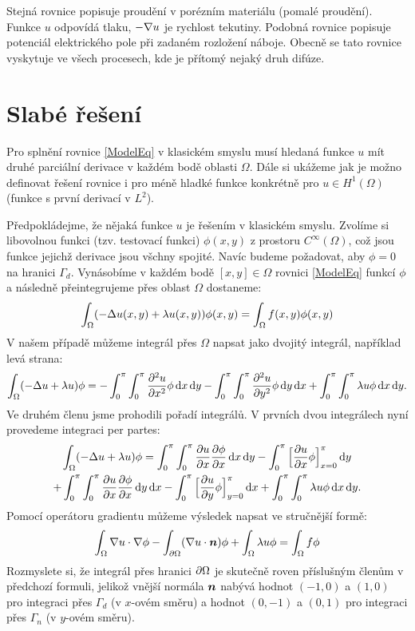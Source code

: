 Stejná rovnice popisuje proudění v porézním materiálu (pomalé proudění). Funkce $u$ odpovídá tlaku, $-\nabla u$ je rychlost tekutiny. Podobná rovnice popisuje potenciál elektrického pole při zadaném rozložení náboje.
Obecně se tato rovnice vyskytuje ve všech procesech, kde je přítomý nejaký druh difúze.


\section{Slabé řešení}
Pro splnění rovnice \eqref{ModelEq} v klasickém smyslu musí hledaná funkce $u$ mít druhé parciální derivace v každém bodě oblasti $\Omega$. Dále si ukážeme jak je možno definovat 
řešení rovnice i pro méně hladké funkce konkrétně pro $u\in H^1(\Omega)$ (funkce s první derivací v $L^2$). 

Předpokládejme, že nějaká funkce $u$ je řešením v klasickém smyslu. 
Zvolíme si libovolnou funkci (tzv. testovací funkci) $\phi(x,y)$ z prostoru $C^{\infty}(\Omega)$, což jsou funkce jejichž derivace jsou všchny spojité.
Navíc budeme požadovat, aby $\phi = 0$ na hranici $\Gamma_d$. Vynásobíme v každém bodě $[x,y]\in \Omega$ rovnici \eqref{ModelEq} funkcí $\phi$ a následně přeintegrujeme přes oblast $\Omega$
dostaneme:
\[
  \int_\Omega (-\Delta u(x,y) + \lambda u(x,y)) \phi(x,y) = \int_\Omega f(x,y)\phi(x,y)
\]
V našem případě můžeme integrál přes $\Omega$ napsat jako dvojitý integrál, například levá strana:
\[
  \int_\Omega (-\Delta u + \lambda u) \phi =
  - \int_0^\pi \int_0^\pi \frac{\partial^2 u}{\partial x^2} \phi \,{\rm d} x\,{\rm d} y\\ 
  - \int_0^\pi \int_0^\pi \frac{\partial^2 u}{\partial y^2} \phi \,{\rm d} y\,{\rm d} x\\
  + \int_0^\pi \int_0^\pi \lambda u \phi \,{\rm d} x \,{\rm d} y.
\]
Ve druhém členu jsme prohodili pořadí integrálů. V prvních dvou integrálech nyní provedeme integraci per partes:
\begin{multline}
  \int_\Omega (-\Delta u + \lambda u) \phi = 
   \int_0^\pi \int_0^\pi \frac{\partial u}{\partial x} \frac{\partial \phi}{\partial x} \,{\rm d} x\,{\rm d} y - \int_0^\pi \Big[ \frac{\partial u}{\partial x} \phi \Big]_{x=0}^\pi \,{\rm d} y\\
  + \int_0^\pi \int_0^\pi \frac{\partial u}{\partial x} \frac{\partial \phi}{\partial x} \,{\rm d} y\,{\rm d} x - \int_0^\pi \Big[ \frac{\partial u}{\partial y} \phi \Big]_{y=0}^\pi \,{\rm d} x
  + \int_0^\pi \int_0^\pi \lambda u \phi \,{\rm d} x \,{\rm d} y.
\end{multline}
Pomocí operátoru gradientu můžeme výsledek napsat ve stručnější formě:
\begin{equation}
  \label{Green}
  \int_\Omega \nabla u \cdot \nabla \phi - \int_{\partial\Omega} (\nabla u \cdot \mathbf{\boldsymbol{n}})\phi + \int_\Omega \lambda u\phi
  =\int_\Omega f\phi
\end{equation}
Rozmyslete si, že integrál přes hranici $\partial\Omega$ je skutečně roven příslušným členům v předchozí formuli, jelikož vnější normála $\mathbf{\boldsymbol{n}}$ nabývá hodnot $(-1,0)$ a $(1,0)$ pro integraci přes $\Gamma_d$  
(v $x$-ovém směru) a hodnot $(0,-1)$ a $(0,1)$ pro integraci přes $\Gamma_n$ (v $y$-ovém směru).

